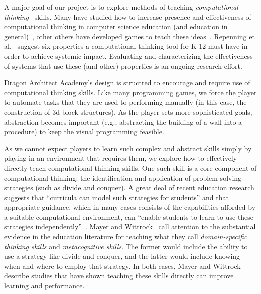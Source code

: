 \documentclass{sig-alternate}
\newcommand{\gametitle}{{\color{RoyalPurple} Dragon Architect Academy}}
\begin{document}
A major goal of our project is to explore methods of teaching \emph{computational thinking}~\cite{wing2008computational} skills.
Many have studied how to increase presence and effectiveness of computational thinking in computer science education (and education in general)~\cite{barr2011bringing, lye2014review},
other others have developed games to teach these ideas~\cite{weintrop2013robobuilder, kazimoglu2012serious}. 
Repenning et al.~\cite{repenning2010scalable} suggest six properties a computational thinking tool for K-12 must have in order to achieve systemic impact. 
Evaluating and characterizing the effectiveness of systems that use these (and other) properties is an ongoing research effort.

\gametitle{}'s design is structred to encourage and require use of computational thinking skills.
Like many programming games, we force the player to automate tasks that they are used to performing manually (in this case, the construction of 3d block structures).
As the player sets more sophisticated goals, abstraction becomes important (e.g., abstracting the building of a wall into a procedure) to keep the visual programming feasible. 

As we cannot expect players to learn such complex and abstract skills simply by playing in an environment that requires them, we explore how to effectively directly teach computational thinking skills.
One such skill is a core component of computational thinking: the identification and application of problem-solving strategies (such as divide and conquer). 
A great deal of recent education research suggests that ``curricula can model such strategies for students'' and that appropriate guidance, which in many cases consists of the capabilities afforded by a suitable computational environment, can ``enable students to learn to use these strategies independently''~\cite{report2010computational}. 
Mayer and Wittrock~\cite{mayer1996handbook} call attention to the substantial evidence in the education literature for teaching what they call \emph{domain-specific thinking skills} and \emph{metacognitive skills}. 
The former would include the ability to use a strategy like divide and conquer, and the latter would include knowing when and where to employ that strategy. 
In both cases, Mayer and Wittrock describe studies that have shown teaching these skills directly can improve learning and performance. 
\end{document}
